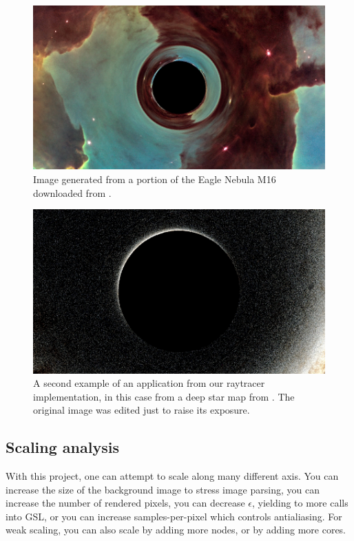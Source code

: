 \begin{figure}[h]
  \centering
  \includegraphics[width=0.8\linewidth]{figs/eagle_render}
  \caption{Image generated from a portion of the Eagle Nebula M16 downloaded from \cite{esa-pillars}.}
  \label{fig:eagle}
\end{figure}


\begin{figure}[h]
  \centering
  \includegraphics[width=0.8\linewidth]{figs/starry_render}
  \caption{A second example of an application from our raytracer implementation,
	in this case from a deep star map from \cite{deepstarmap-nasa_svs}.
	The original image was edited just to raise its exposure.}
  \label{fig:starry}
\end{figure}




\subsection{Scaling analysis}

With this project, one can attempt to scale along many different axis. You can increase the size of the background image to stress image parsing, you can increase the number of rendered pixels, you can decrease $\epsilon$, yielding to more calls into GSL, or you can increase samples-per-pixel which controls antialiasing. For weak scaling, you can also scale by adding more nodes, or by adding more cores. 


